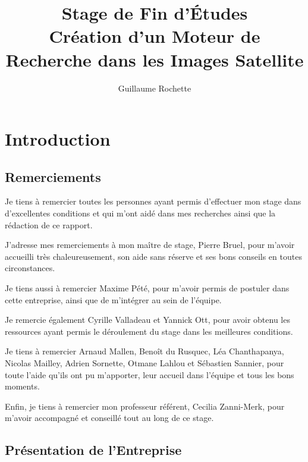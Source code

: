 \documentclass[a4paper, 11pt]{report}
\author{Guillaume Rochette}
\title{Stage de Fin d'Études
		\\
Création d'un Moteur de Recherche dans les Images Satellite}
\begin{document}
\maketitle
\tableofcontents
	
\chapter{Introduction}
\section{Remerciements}
Je tiens à remercier toutes les personnes ayant permis d'effectuer mon stage dans d'excellentes conditions et qui m'ont aidé dans mes recherches ainsi que la rédaction de ce rapport.

J'adresse mes remerciements à mon maître de stage, Pierre Bruel, pour m'avoir accueilli très chaleureusement, son aide sans réserve et ses bons conseils en toutes circonstances.

Je tiens aussi à remercier Maxime Pété, pour m'avoir permis de postuler dans cette entreprise, ainsi que de m'intégrer au sein de l'équipe.

Je remercie également Cyrille Valladeau et Yannick Ott, pour avoir obtenu les ressources ayant permis le déroulement du stage dans les meilleures conditions.

Je tiens à remercier Arnaud Mallen, Benoît du Rusquec, Léa Chanthapanya, Nicolas Mailley, Adrien Sornette, Otmane Lahlou et Sébastien Sannier, pour toute l'aide qu'ils ont pu m'apporter, leur accueil dans l'équipe et tous les bons moments.

Enfin, je tiens à remercier mon professeur référent, Cecilia Zanni-Merk, pour m'avoir accompagné et conseillé tout au long de ce stage.


\section{Présentation de l'Entreprise}
\end{document}

